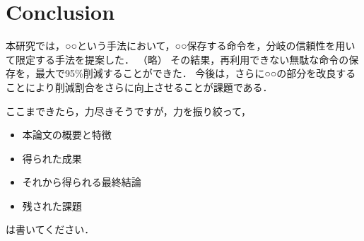 \chapter{Conclusion}
本研究では，○○という手法において，○○保存する命令を，分岐の信頼性を用いて限定する手法を提案した．
（略）
その結果，再利用できない無駄な命令の保存を，最大で95\%削減することができた．
今後は，さらに○○の部分を改良することにより削減割合をさらに向上させることが課題である．

ここまできたら，力尽きそうですが，力を振り絞って，
\begin{itemize}
\item 本論文の概要と特徴
\item 得られた成果
\item それから得られる最終結論
\item 残された課題
\end{itemize}
は書いてください．
